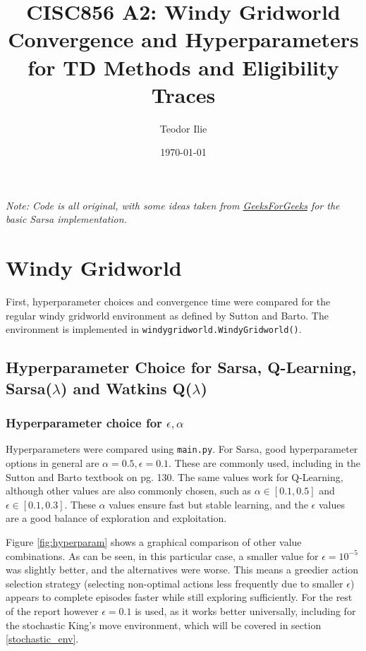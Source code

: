 \documentclass{article}
\title{CISC856 A2: Windy Gridworld Convergence and Hyperparameters for TD Methods and Eligibility Traces}
\author{Teodor Ilie}
\date{\today}
\newcommand{\code}[1]{\texttt{#1}}
\begin{document}
\maketitle

\textit{Note: Code is all original, with some ideas taken from \href{https://www.geeksforgeeks.org/sarsa-reinforcement-learning/}{GeeksForGeeks} for the basic Sarsa implementation.}

\section{Windy Gridworld}\label{standard_env}
First, hyperparameter choices and convergence time were compared for the regular windy gridworld environment as defined by Sutton and Barto. The environment is implemented in \code{windygridworld.WindyGridworld()}.

\subsection{Hyperparameter Choice for Sarsa, Q-Learning, Sarsa($\lambda$) and Watkins Q($\lambda$)}

\subsubsection{Hyperparameter choice for $\epsilon, \alpha$}

Hyperparameters were compared using \code{main.py}. For Sarsa, good hyperparameter options in general are $\alpha = 0.5, \epsilon = 0.1$. These are commonly used, including in the Sutton and Barto textbook on pg. 130. The same values work for Q-Learning, although other values are also commonly chosen, such as $\alpha \in [0.1, 0.5]$ and $\epsilon \in [0.1, 0.3]$. These $\alpha$ values ensure fast but stable learning, and the $\epsilon$ values are a good balance of exploration and exploitation. 

Figure \ref{fig:hyperparam} shows a graphical comparison of other value combinations. As can be seen, in this particular case, a smaller value for $\epsilon=10^{-5}$ was slightly better, and the alternatives were worse. This means a greedier action selection strategy (selecting non-optimal actions less frequently due to smaller $\epsilon$) appears to complete episodes faster while still exploring sufficiently. For the rest of the report however $\epsilon=0.1$ is used, as it works better universally, including for the stochastic King's move environment, which will be covered in section \ref{stochastic_env}.
\end{document}
